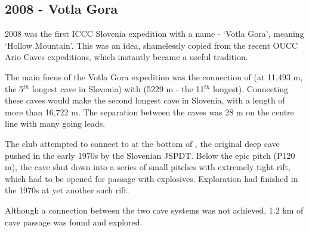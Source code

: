 \begin{tcolorbox}
\chapter{2008 - Votla Gora}

2008 was the first ICCC Slovenia expedition with a name - `Votla
Gora', meaning `Hollow Mountain'. This was an idea, shamelessly copied from the recent OUCC Ario Caves expeditions, which instantly became a useful tradition.

The main focus of the Votla Gora expedition was the connection of  (at 11,493 m, the 5\(^{th}\) longest cave in Slovenia) with  (5229 m - the 11\(^{th}\) longest). Connecting these caves would make the second longest cave in Slovenia, with a length of more than 16,722 m. The separation between the caves was 28 m on the centre line with many going leads.

The club attempted to connect  to  at the bottom of , the original deep cave pushed in the early 1970s by the Slovenian JSPDT. Below the epic  pitch (P120 m), the cave shut down into a series of small pitches with extremely tight rift, which had to be opened for passage with explosives. Exploration had finished in the 1970s at yet another such rift.

Although a connection between the two cave systems was not achieved, 1.2 km of cave passage was found and explored.

\end{tcolorbox}
